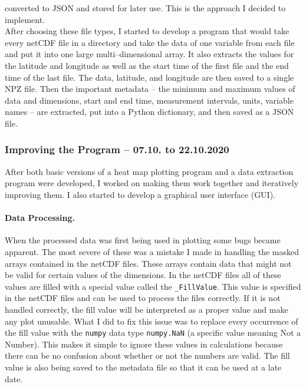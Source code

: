 \documentclass[../00_main.tex]{subfiles}
\begin{document}
converted to JSON and stored for later use. This is the approach I decided to
implement.\\
After choosing these file types, I started to develop a program that would
take every netCDF file in a directory and take the data of one variable from
each file and put it into one large multi--dimensional array. It also extracts
the values for the latitude and longitude as well as the start time of the
first file and the end time of the last file. The data, latitude, and longitude
are then saved to a single NPZ file. Then the important metadata -- the minimum
and maximum values of data and dimensions, start and end time, measurement
intervals, units, variable names -- are extracted, put into a Python
dictionary, and then saved as a JSON file.

\subsubsection{Improving the Program -- 07.10. to 22.10.2020}

After both basic versions of a heat map plotting program and a data extraction
program were developed, I worked on making them work together and
iteratively improving them. I also started to develop a graphical user
interface (GUI).

\paragraph{Data Processing.}

When the processed data was first being used in plotting some bugs became
apparent. The most severe of these was a mistake I made in handling the masked
arrays contained in the netCDF files. These arrays contain data that might not
be valid for certain values of the dimensions. In the netCDF files all of these
values are filled with a special value called the \texttt{\_FillValue}. This
value is specified in the netCDF files and can be used to process the files
correctly. If it is not handled correctly, the fill value will be interpreted
as a proper value and make any plot unusable. What I did to fix this issue was
to replace every occurrence of the fill value with the \texttt{numpy} data type
\texttt{numpy.NaN} (a specific value meaning Not a Number). This makes it simple
to ignore these values in calculations because there can be no confusion about
whether or not the numbers are valid. The fill value is also being saved to the
metadata file so that it can be used at a late date.
\end{document}
